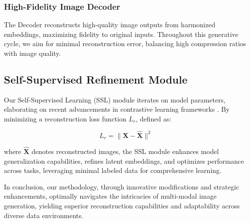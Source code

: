 \subsubsection{High-Fidelity Image Decoder}

The Decoder reconstructs high-quality image outputs from harmonized embeddings, maximizing fidelity to original inputs. Throughout this generative cycle, we aim for minimal reconstruction error, balancing high compression ratios with image quality.

\subsection{Self-Supervised Refinement Module}

Our Self-Supervised Learning (SSL) module iterates on model parameters, elaborating on recent advancements in contrastive learning frameworks \cite{chen2020simple}. By minimizing a reconstruction loss function $L_r$, defined as:

\[
L_r = \|\mathbf{X} - \hat{\mathbf{X}}\|^2
\]

where $\hat{\mathbf{X}}$ denotes reconstructed images, the SSL module enhances model generalization capabilities, refines latent embeddings, and optimizes performance across tasks, leveraging minimal labeled data for comprehensive learning.

In conclusion, our methodology, through innovative modifications and strategic enhancements, optimally navigates the intricacies of multi-modal image generation, yielding superior reconstruction capabilities and adaptability across diverse data environments.
